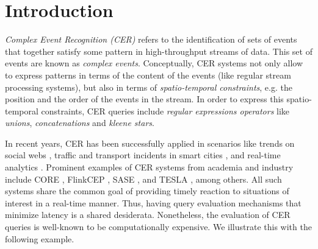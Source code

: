 \chapter{Introduction}\label{chapter:introduction}

\emph{Complex Event Recognition (CER)} refers to the identification of sets of events that together satisfy some pattern in high-throughput streams of data. This set of events are known as \emph{complex events}. Conceptually, CER systems not only allow to express patterns in terms of the content of the events (like regular stream processing systems), but also in terms of \emph{spatio-temporal constraints}, e.g. the position and the order of the events in the stream. In order to express this spatio-temporal constraints, CER queries include \emph{regular expressions operators} like \emph{unions}, \emph{concatenations} and \emph{kleene stars}.

In recent years, CER has been successfully applied in scenarios like trends on social webs \cite{survey-systems-1}, traffic and transport incidents in smart cities \cite{survey-systems-1}, and real-time analytics \cite{real-time-analytics}. Prominent examples of CER systems from academia and industry include CORE \cite{core}, FlinkCEP \cite{flink-cep}, SASE \cite{sase}, and TESLA \cite{tesla}, among others.  All such systems share the common goal of providing timely reaction to situations of interest in a real-time manner. Thus, having query evaluation mechanisms that minimize latency is a shared desiderata. Nonetheless, the evaluation of CER queries is well-known to be computationally expensive. We illustrate this with the following example.

